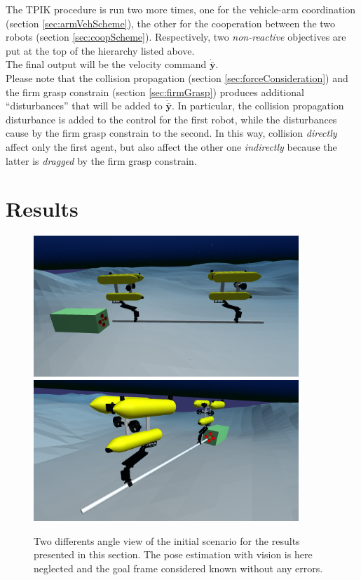 The TPIK procedure is run two more times, one for the vehicle-arm coordination (section \ref{sec:armVehScheme}), the other for the cooperation between the two robots (section \ref{sec:coopScheme}). Respectively, two \textit{non-reactive} objectives are put at the top of the hierarchy listed above.\\
The final output will be the velocity command $\boldsymbol{\dot{\bar{y}}}$.\\

\noindent Please note that the collision propagation (section \ref{sec:forceConsideration}) and the firm grasp constrain (section \ref{sec:firmGrasp}) produces additional \enquote{disturbances} that will be added to $\boldsymbol{\dot{\bar{y}}}$.
In particular, the collision propagation disturbance is added to the control for the first robot, while the disturbances cause by the firm grasp constrain to the second. In this way, collision \textit{directly} affect only the first agent, but also affect the other one \textit{indirectly} because the latter is \textit{dragged} by the firm grasp constrain.\\


\section{Results}
\begin{figure}[H]
	\centering
	\includegraphics[width=10cm]{scenario_onlyTwin.png}
	\includegraphics[width=10cm]{scenario_onlyTwin2.png}
	
	\caption[Scenario for test without the vision part]{Two differents angle view of the initial scenario for the results presented in this section. The pose estimation with vision is here neglected and the goal frame considered known without any errors.}
	\label{fig:onlyTwin_uwsim}
\end{figure}

